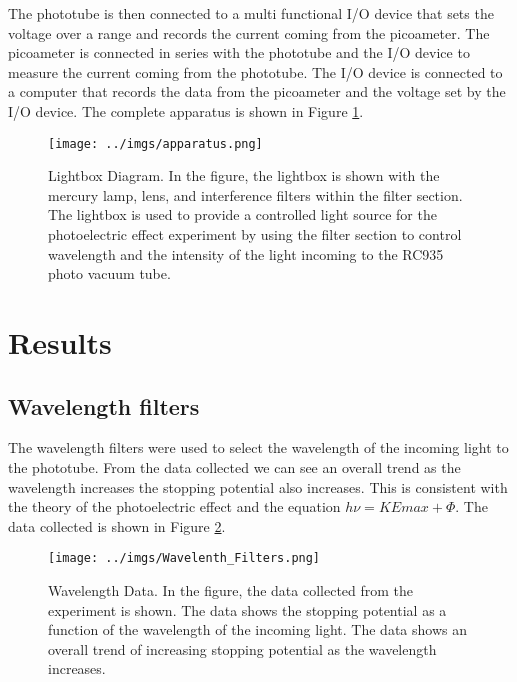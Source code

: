 \documentclass[12pt]{article}
\begin{document}
        The phototube is then connected to a multi functional I/O device that sets the voltage over a range and records the 
        current coming from the picoameter. The picoameter is connected in series with the phototube and the I/O device to 
        measure the current coming from the phototube. The I/O device is connected to a computer that records the data from
        the picoameter and the voltage set by the I/O device. The complete apparatus is shown in Figure \ref{fig: Apparatus Diagram}.

        \newpage

        \begin{figure}[!h]
                \centering
                \texttt{[image: ../imgs/apparatus.png]}
                \caption{Lightbox Diagram. In the figure, the lightbox is shown with the mercury lamp, lens, and interference filters within the filter section.
                 The lightbox is used to provide a controlled light source for the photoelectric effect experiment by using the filter section to control wavelength and the intensity of the light incoming to the RC935 photo vacuum tube.}
                \label{fig: Apparatus Diagram}
        \end{figure}

\section{Results}
        \subsection{Wavelength filters}
        The wavelength filters were used to select the wavelength of the incoming light to the phototube. From the data collected
        we can see an overall trend as the wavelength increases the stopping potential also increases. This is consistent with
        the theory of the photoelectric effect and the equation \( h\nu = KEmax + \Phi \). The data collected is shown in Figure \ref{fig: Wavelength Data}.

        \begin{figure}[!h]
                \centering
                \texttt{[image: ../imgs/Wavelenth\_Filters.png]}
                \caption{Wavelength Data. In the figure, the data collected from the experiment is shown. The data shows the 
                stopping potential as a function of the wavelength of the incoming light. The data shows an overall trend of
                increasing stopping potential as the wavelength increases.}
                \label{fig: Wavelength Data}
        \end{figure}
\end{document}
